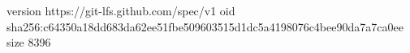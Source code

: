 version https://git-lfs.github.com/spec/v1
oid sha256:c64350a18dd683da62ee51fbe509603515d1dc5a4198076c4bee90da7a7ca0ee
size 8396
